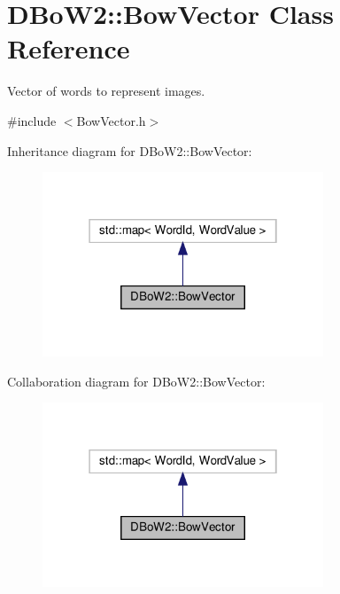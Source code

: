 \hypertarget{classDBoW2_1_1BowVector}{}\section{D\+Bo\+W2\+:\+:Bow\+Vector Class Reference}
\label{classDBoW2_1_1BowVector}


Vector of words to represent images.  




{\ttfamily \#include $<$Bow\+Vector.\+h$>$}



Inheritance diagram for D\+Bo\+W2\+:\+:Bow\+Vector\+:\nopagebreak
\begin{figure}[H]
\begin{center}
\leavevmode
\includegraphics[width=238pt]{classDBoW2_1_1BowVector__inherit__graph}
\end{center}
\end{figure}


Collaboration diagram for D\+Bo\+W2\+:\+:Bow\+Vector\+:\nopagebreak
\begin{figure}[H]
\begin{center}
\leavevmode
\includegraphics[width=238pt]{classDBoW2_1_1BowVector__coll__graph}
\end{center}
\end{figure}
